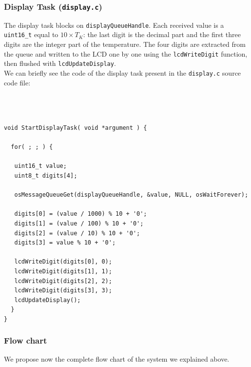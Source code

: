 \documentclass[../main.tex]{subfiles}
\begin{document}
\subsubsection*{Display Task (\texttt{display.c})}

The display task blocks on \texttt{displayQueueHandle}. Each received value is a \texttt{uint16\_t} equal to \(10 \times T_K\): the last digit is the decimal part and the first three digits are the integer part of the temperature. The four digits are extracted from the queue and written to the LCD one by one using the \texttt{lcdWriteDigit} function, then flushed with \texttt{lcdUpdateDisplay}.\\

We can briefly see the code of the display task present in the \texttt{display.c} source code file:\\

\begin{lstlisting}



void StartDisplayTask( void *argument ) {

  for( ; ; ) {

   uint16_t value;
   uint8_t digits[4];

   osMessageQueueGet(displayQueueHandle, &value, NULL, osWaitForever);

   digits[0] = (value / 1000) % 10 + '0';
   digits[1] = (value / 100) % 10 + '0';
   digits[2] = (value / 10) % 10 + '0';
   digits[3] = value % 10 + '0';

   lcdWriteDigit(digits[0], 0);
   lcdWriteDigit(digits[1], 1);    
   lcdWriteDigit(digits[2], 2);
   lcdWriteDigit(digits[3], 3);
   lcdUpdateDisplay();
  }
}

\end{lstlisting}


\subsubsection*{Flow chart}

We propose now the complete flow chart of the system we explained above.
\end{document}
